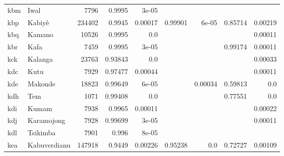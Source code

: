 \documentclass[11pt]{article}
\begin{document}
\begin{table*}[h]
{\begin{tabular}{llrrrrrrr}
kbm         & Iwal         & 7796         & 0.9995         & 3e-05         &          &          &          &          \\

kbp         & Kabiyè         & 234402         & 0.9945         & 0.00017         & 0.99901         & 6e-05         & 0.85714         & 0.00219         \\

kbq         & Kamano         & 10526         & 0.9995         & 0.0         &          &          &          & 0.00011         \\

kbr         & Kafa         & 7459         & 0.9995         & 3e-05         &          &          & 0.99174         & 0.00011         \\

kck         & Kalanga         & 23763         & 0.93843         & 0.0         &          &          &          & 0.00033         \\

kdc         & Kutu         & 7929         & 0.97477         & 0.00044         &          &          &          & 0.00011         \\

kde         & Makonde         & 18823         & 0.99649         & 6e-05         &          & 0.00034         & 0.59813         & 0.0         \\

kdh         & Tem         & 1071         & 0.99408         & 0.0         &          &          & 0.77551         & 0.0         \\

kdi         & Kumam         & 7938         & 0.9965         & 0.00011         &          &          &          & 0.00022         \\

kdj         & Karamojong         & 7928         & 0.99699         & 3e-05         &          &          &          & 0.00011         \\

kdl         & Tsikimba         & 7901         & 0.996         & 8e-05         &          &          &          &          \\

kea         & Kabuverdianu         & 147918         & 0.9449         & 0.00226         & 0.95238         & 0.0         & 0.72727         & 0.00109         \\


\end{tabular}}
\end{table*}
\end{document}
